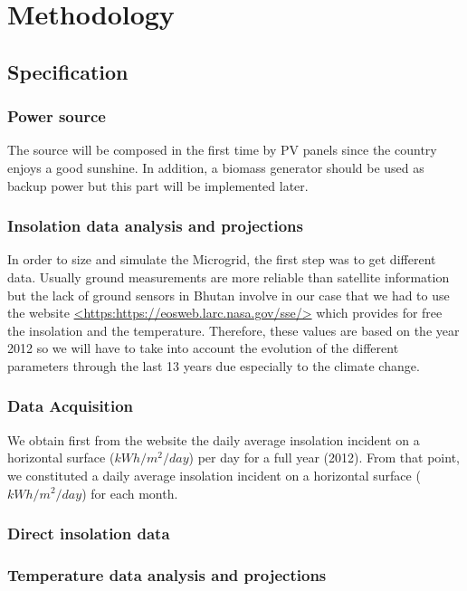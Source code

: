 \documentclass{article}
\begin{document}
\section{Methodology}

\subsection{Specification}

\subsubsection{Power source}

The source will be composed in the first time by PV panels since the country enjoys a good sunshine. In addition, a biomass generator should be used as backup power but this part will be implemented later.

\subsubsection{Insolation data analysis and projections}

In order to size and simulate the Microgrid, the first step was to get different data. Usually ground measurements are more reliable than satellite information but the lack of ground sensors in Bhutan involve in our case that we had to use the website \url{<https:https://eosweb.larc.nasa.gov/sse/>} which provides for free the insolation and the temperature. Therefore, these values are based on the year 2012 so we will have to take into account the evolution of the different parameters through the last 13 years due especially to the climate change.

\subsubsection{Data Acquisition}

We obtain first from the website the daily average insolation incident on a horizontal surface ($kWh/m^2/day$) per day for a full year (2012).
 From that point, we constituted a daily average insolation incident on a horizontal surface ($kWh/m^2/day$) for each month.
 

\subsubsection{Direct insolation data}
\subsubsection{Temperature data analysis and projections}
\end{document}
